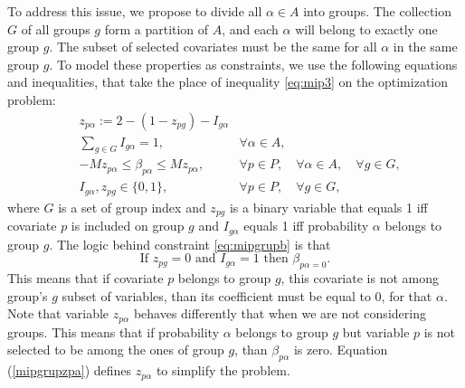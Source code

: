 To address this issue, we propose to divide all $\alpha \in A$ into groups. The collection $G$ of all groups $g$ form a partition of $A$, and each $\alpha$ will belong to exactly one group $g$. 
The subset of selected covariates must be the same for all $\alpha$ in the same group $g$. To model these properties as constraints, we use the following equations and inequalities, that take the place of inequality \ref{eq:mip3} on the optimization problem:
\begin{eqnarray}
&z_{p \alpha} := 2 - ( 1-z_{pg}) - I_{g\alpha}& \label{mipgrupzpa} \\
& \sum\limits_{g \in G} I_{g\alpha} = 1, & \forall \alpha \in A,\label{eq:mipgrupa} \\
& -Mz_{p \alpha}  \leq  \beta_{p \alpha} \leq M z_{p \alpha}, & \forall p \in P, \quad \forall \alpha \in A, \quad \forall g \in G, \label{eq:mipgrupb} \\
& I_{g\alpha}, z_{pg} \in \{0,1\},& \forall p \in P, \quad \forall g \in G, 
\end{eqnarray}
where $G$ is a set of group index and $z_{pg}$ is a binary variable that equals 1 iff covariate $p$ is included on group $g$ and $I_{g\alpha}$ equals 1 iff probability $\alpha$ belongs to group $g$. 
The logic behind constraint \ref{eq:mipgrupb} is that 
$$\text{If }z_{pg} = 0 \text{ and }I_{g\alpha} =1 \text{ then } \beta_{p \alpha = 0}. $$
This means that if covariate $p$ belongs to group $g$, this covariate is not among group's $g$ subset of variables, than its coefficient must be equal to $0$, for that $\alpha$.
Note that variable $z_{p \alpha}$ behaves differently that when we are not considering groups. This means that if probability $\alpha$ belongs to group $g$ but variable $p$ is not selected to be among the ones of group $g$, than $\beta_{p\alpha}$ is zero.
Equation (\ref{mipgrupzpa}) defines $z_{p\alpha}$ to simplify the problem.

